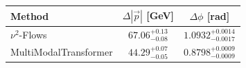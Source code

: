     \begin{tabular}{lcc}
        \toprule
        Method & $\Delta |\vec p|$ [GeV] & $\Delta \phi$ [rad] \\
        \midrule
        $\nu^2$-Flows & $67.06^{+0.13}_{-0.08}$ & $1.0932^{+0.0014}_{-0.0017}$ \\
        MultiModalTransformer & $44.29^{+0.07}_{-0.05}$ & $0.8798^{+0.0009}_{-0.0009}$ \\
        \bottomrule
    \end{tabular}